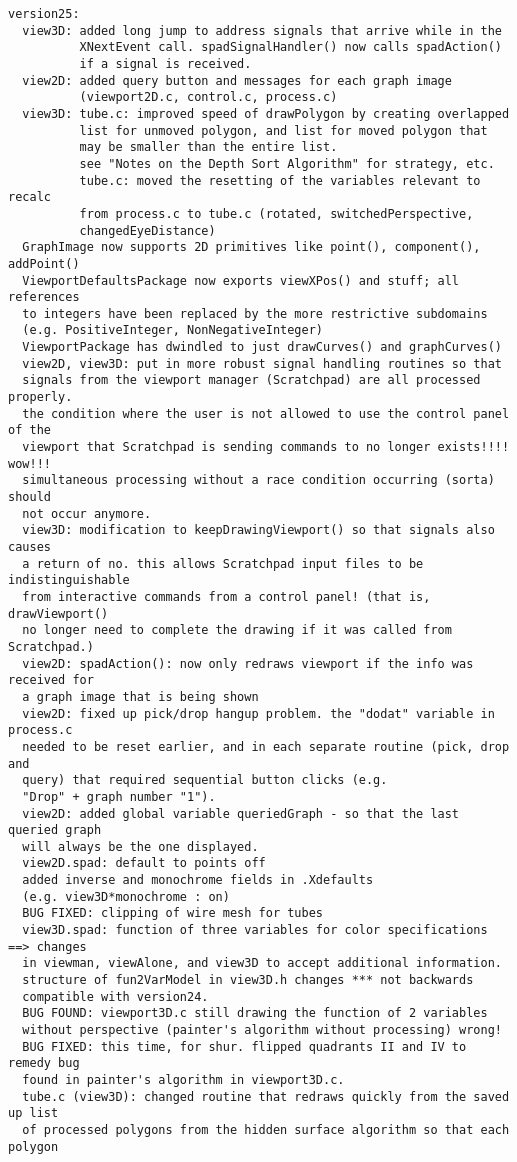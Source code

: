 \documentclass{article}
\begin{document}
\begin{verbatim}
version25:
  view3D: added long jump to address signals that arrive while in the
          XNextEvent call. spadSignalHandler() now calls spadAction()
          if a signal is received.
  view2D: added query button and messages for each graph image
          (viewport2D.c, control.c, process.c)
  view3D: tube.c: improved speed of drawPolygon by creating overlapped
          list for unmoved polygon, and list for moved polygon that
          may be smaller than the entire list.
          see "Notes on the Depth Sort Algorithm" for strategy, etc.
          tube.c: moved the resetting of the variables relevant to recalc
          from process.c to tube.c (rotated, switchedPerspective,
          changedEyeDistance)
  GraphImage now supports 2D primitives like point(), component(), addPoint()
  ViewportDefaultsPackage now exports viewXPos() and stuff; all references
  to integers have been replaced by the more restrictive subdomains
  (e.g. PositiveInteger, NonNegativeInteger)
  ViewportPackage has dwindled to just drawCurves() and graphCurves()
  view2D, view3D: put in more robust signal handling routines so that
  signals from the viewport manager (Scratchpad) are all processed properly.
  the condition where the user is not allowed to use the control panel of the
  viewport that Scratchpad is sending commands to no longer exists!!!! wow!!!
  simultaneous processing without a race condition occurring (sorta) should
  not occur anymore.
  view3D: modification to keepDrawingViewport() so that signals also causes
  a return of no. this allows Scratchpad input files to be indistinguishable
  from interactive commands from a control panel! (that is, drawViewport()
  no longer need to complete the drawing if it was called from Scratchpad.)
  view2D: spadAction(): now only redraws viewport if the info was received for
  a graph image that is being shown
  view2D: fixed up pick/drop hangup problem. the "dodat" variable in process.c
  needed to be reset earlier, and in each separate routine (pick, drop and
  query) that required sequential button clicks (e.g.
  "Drop" + graph number "1").
  view2D: added global variable queriedGraph - so that the last queried graph
  will always be the one displayed.
  view2D.spad: default to points off
  added inverse and monochrome fields in .Xdefaults
  (e.g. view3D*monochrome : on)
  BUG FIXED: clipping of wire mesh for tubes
  view3D.spad: function of three variables for color specifications ==> changes
  in viewman, viewAlone, and view3D to accept additional information.
  structure of fun2VarModel in view3D.h changes *** not backwards
  compatible with version24.
  BUG FOUND: viewport3D.c still drawing the function of 2 variables
  without perspective (painter's algorithm without processing) wrong!
  BUG FIXED: this time, for shur. flipped quadrants II and IV to remedy bug
  found in painter's algorithm in viewport3D.c.
  tube.c (view3D): changed routine that redraws quickly from the saved up list
  of processed polygons from the hidden surface algorithm so that each polygon


\end{verbatim}
\end{document}
